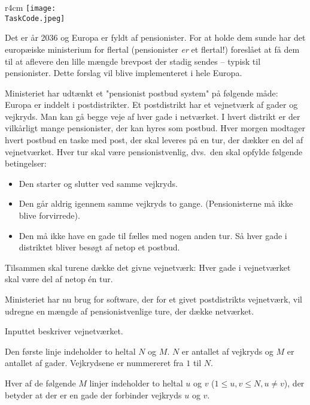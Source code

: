 \documentclass{boi2014-dk}
\renewcommand{\TaskCode}{postmen}
\begin{document}
    \begin{wrapfigure}[8]{r}{4cm}
        \vspace{-18pt}
		\texttt{[image: \\TaskCode.jpeg]}
	\end{wrapfigure}

    Det er år 2036 og Europa er fyldt af pensionister. For at holde dem sunde
    har det europæiske ministerium for flertal (pensionister \emph{er} et
    flertal!) foreslået at få dem til at aflevere den lille mængde brevpost
    der stadig sendes -- typisk til pensionister. Dette forslag vil blive
    implementeret i hele Europa.

    Ministeriet har udtænkt et "pensionist postbud system" på følgende måde:
    Europa er inddelt i postdistrikter. Et postdistrikt har et vejnetværk af
    gader og vejkryds. Man kan gå begge veje af hver gade i netværket. I hvert
    distrikt er der vilkårligt mange pensionister, der kan hyres som postbud.
    Hver morgen modtager hvert postbud en taske med post, der skal leveres på
    en tur, der dækker en del af vejnetværket. Hver tur skal være
    pensionistvenlig, dvs.~den skal opfylde følgende betingelser:

    \begin{itemize}
        \item Den starter og slutter ved samme vejkryds.
        \item Den går aldrig igennem samme vejkryds to gange. (Pensionisterne
            må ikke blive forvirrede).
        \item Den må ikke have en gade til fælles med nogen anden tur. Så hver
            gade i distriktet bliver besøgt af netop et postbud.
    \end{itemize}

    Tilsammen skal turene dække det givne vejnetværk: Hver gade i
    vejnetværket skal være del af netop én tur.

    \Task
    Ministeriet har nu brug for software, der for et givet postdistrikts
    vejnetværk, vil udregne en mængde af pensionistvenlige ture, der
    dække netværket.

    \Input
    Inputtet beskriver vejnetværket.

    Den første linje indeholder to heltal $N$ og $M$. $N$ er antallet af
    vejkryds og $M$ er antallet af gader. Vejkrydsene er nummereret fra
    $1$ til $N$.

    Hver af de følgende $M$ linjer indeholder to heltal $u$ og $v$ ($1\le
    u,v\le N, u\ne v$), der betyder at der er en gade der forbinder vejkryds
    $u$ og $v$.
\end{document}
